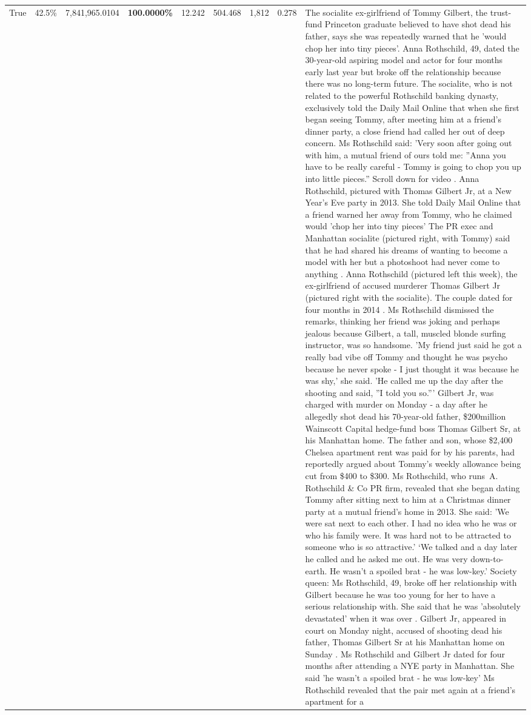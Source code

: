 \begin{table}[H]
\begin{tabular}{lllrlllll}
True & 42.5\% & 7,841,965.0104 & \bfseries \color{red} 100.0000\% & 12.242 & 504.468 & 1,812 & 0.278 & The socialite ex-girlfriend of Tommy Gilbert, the trust-fund Princeton graduate believed to have shot dead his father, says she was repeatedly warned that he 'would chop her into tiny pieces'. Anna Rothschild, 49, dated the 30-year-old aspiring model and actor for four months early last year but broke off the relationship because there was no long-term future. The socialite, who is not related to the powerful Rothschild banking dynasty, exclusively told the Daily Mail Online that when she first began seeing Tommy, after meeting him at a friend's dinner party, a close friend had called her out of deep concern. Ms Rothschild said: 'Very soon after going out with him, a mutual friend of ours told me: ''Anna you have to be really careful - Tommy is going to chop you up into little pieces.'' Scroll down for video . Anna Rothschild, pictured with Thomas Gilbert Jr, at a New Year's Eve party in 2013. She told Daily Mail Online that a friend warned her away from Tommy, who he claimed would 'chop her into tiny pieces' The PR exec and Manhattan socialite (pictured right, with Tommy) said that he had shared his dreams of wanting to become a model with her but a photoshoot had never come to anything . Anna Rothschild (pictured left this week), the ex-girlfriend of accused murderer Thomas Gilbert Jr (pictured right with the socialite). The couple dated for four months in 2014 . Ms Rothschild dismissed the remarks, thinking her friend was joking and perhaps jealous because Gilbert, a tall, muscled blonde surfing instructor, was so handsome. 'My friend just said he got a really bad vibe off Tommy and thought he was psycho because he never spoke - I just thought it was because he was shy,' she said. 'He called me up the day after the shooting and said, ''I told you so.''' Gilbert Jr, was charged with murder on Monday - a day after he allegedly shot dead his 70-year-old father, \$200million Wainscott Capital hedge-fund boss Thomas Gilbert Sr, at his Manhattan home. The father and son, whose \$2,400 Chelsea apartment rent was paid for by his parents, had reportedly argued about Tommy's weekly allowance being cut from \$400 to \$300. Ms Rothschild, who runs A. Rothschild \& Co PR firm, revealed that she began dating Tommy after sitting next to him at a Christmas dinner party at a mutual friend's home in 2013. She said: 'We were sat next to each other. I had no idea who he was or who his family were. It was hard not to be attracted to someone who is so attractive.' ‘We talked and a day later he called and he asked me out. He was very down-to-earth. He wasn’t a spoiled brat - he was low-key.’ Society queen: Ms Rothschild, 49, broke off her relationship with Gilbert because he was too young for her to have a serious relationship with. She said that he was 'absolutely devastated' when it was over . Gilbert Jr, appeared in court on Monday night, accused of shooting dead his father, Thomas Gilbert Sr at his Manhattan home on Sunday . Ms Rothschild and Gilbert Jr dated for four months after attending a NYE party in Manhattan. She said 'he wasn't a spoiled brat - he was low-key' Ms Rothschild revealed that the pair met again at a friend’s apartment for a 
\end{tabular}
\end{table}
